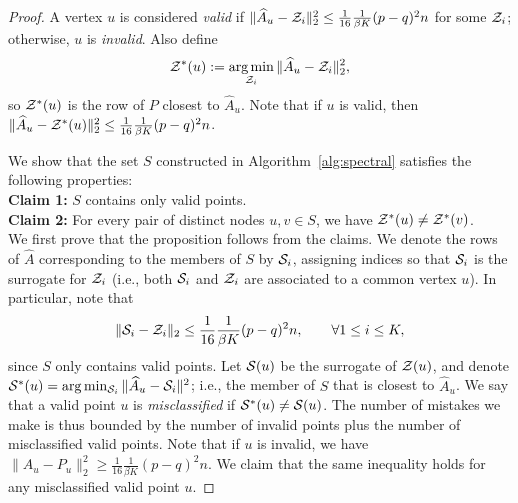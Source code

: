 \documentclass{article}
\begin{document}
\begin{proof}
A vertex $u$ is considered \emph{valid} if $\| \hat{A}_u - {\cal Z}_i \|_2^2 \leq \frac{1}{16} \frac{1}{\beta K} (p-q)^2 n$ for some ${\cal Z}_i$; otherwise, $u$ is \emph{invalid}. Also define
\begin{equation*}
{\cal Z}^*(u) := \argmin_{{\cal Z}_i} \| \hat{A}_u - {\cal Z}_i \|_2^2,
\end{equation*}
so ${\cal Z}^*(u)$ is the row of $P$ closest to $\hat{A}_u$. Note that if $u$ is valid, then $\| \hat{A}_u - {\cal Z}^*(u) \|_2^2 \leq \frac{1}{16} \frac{1}{\beta K} (p - q)^2 n$.

We show that the set $S$ constructed in Algorithm~\ref{alg:spectral} satisfies the following properties:\\

\noindent \textbf{Claim 1:} $S$ contains only valid points. \\
\textbf{Claim 2:} For every pair of distinct nodes $u,v \in S$, we have ${\cal Z}^*(u) \neq {\cal Z}^*(v)$. \\

We first prove that the proposition follows from the claims. We denote the rows of $\hat A$ corresponding to the members of $S$ by ${\cal S}_i$, assigning indices so that ${\cal S}_i$ is the surrogate for ${\cal  Z}_i$ (i.e., both ${\cal S}_i$ and ${\cal Z}_i$ are associated to a common vertex $u$). In particular, note that
\begin{equation*}
\|{\cal S}_i - {\cal Z}_i\|_2 \le \frac{1}{16} \frac{1}{\beta K} (p-q)^2 n, \qquad \forall 1 \le i \le K,
\end{equation*}
since $S$ only contains valid points. Let ${\cal S}(u)$ be the surrogate of ${\cal Z}(u)$, and denote ${\cal S}^*(u) =\arg\min_{{\cal S}_i} \| \hat A_u - {\cal S}_i \|^2$; i.e., the member of $S$ that is closest to $\hat A_u$. We say that a valid point $u$ is \emph{misclassified} if ${\cal S}^*(u) \neq {\cal S}(u)$. The number of mistakes we make is thus bounded by the number of invalid points plus the number of misclassified valid points. Note that if $u$ is invalid, we have $\|\hat{A}_u - P_u\|_2^2 \ge \frac{1}{16} \frac{1}{\beta K} (p-q)^2n$. We claim that the same inequality holds for any misclassified valid point $u$. 


\end{proof}
\end{document}
